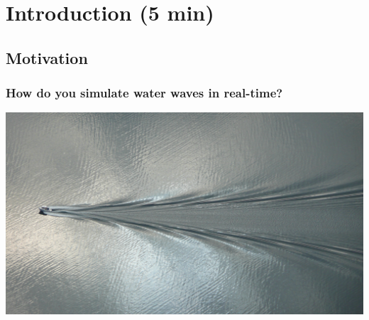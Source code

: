 \section{Introduction (5 min)}

\subsection{Motivation}

\begin{frame}
\frametitle{How do you simulate water waves in real-time?}

\includegraphics[width=\textwidth]{Images/Attribute/Wake/Fjord_surface_wave_boat}
\end{frame}
